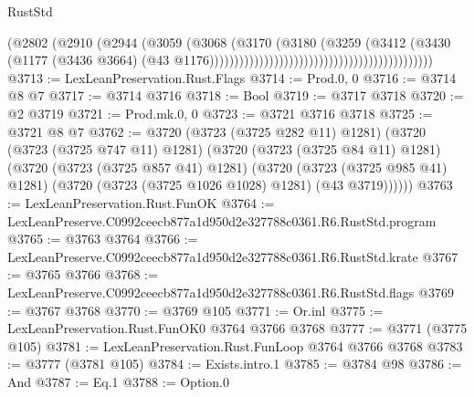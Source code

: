 \begin{lexlean}{RustStd}
\begin{coremodule}
                                                                      (@2802
                                                                        (@2910
                                                                          (@2944
                                                                            (@3059
                                                                              (@3068
                                                                                (@3170
                                                                                  (@3180
                                                                                    (@3259
                                                                                      (@3412
                                                                                        (@3430
                                                                                          (@1177
                                                                                            (@3436
                                                                                              @3664)
                                                                                            (@43
                                                                                              @1176)))))))))))))))))))))))))))))))))))))))))))))
@3713 := LexLeanPreservation.Rust.Flags
@3714 := Prod.{0, 0}
@3716 := @3714 @8 @7
@3717 := @3714 @3716
@3718 := Bool
@3719 := @3717 @3718
@3720 := @2 @3719
@3721 := Prod.mk.{0, 0}
@3723 := @3721 @3716 @3718
@3725 := @3721 @8 @7
@3762 := @3720
    (@3723 (@3725 @282 @11) @1281)
    (@3720
      (@3723 (@3725 @747 @11) @1281)
      (@3720
        (@3723 (@3725 @84 @11) @1281)
        (@3720
          (@3723 (@3725 @857 @41) @1281)
          (@3720
            (@3723 (@3725 @985 @41) @1281)
            (@3720 (@3723 (@3725 @1026 @1028) @1281) (@43 @3719))))))
@3763 := LexLeanPreservation.Rust.FunOK
@3764 := LexLeanPreserve.C0992ceecb877a1d950d2e327788c0361.R6.RustStd.program
@3765 := @3763 @3764
@3766 := LexLeanPreserve.C0992ceecb877a1d950d2e327788c0361.R6.RustStd.krate
@3767 := @3765 @3766
@3768 := LexLeanPreserve.C0992ceecb877a1d950d2e327788c0361.R6.RustStd.flags
@3769 := @3767 @3768
@3770 := @3769 @105
@3771 := Or.inl
@3775 := LexLeanPreservation.Rust.FunOK0 @3764 @3766 @3768
@3777 := @3771 (@3775 @105)
@3781 := LexLeanPreservation.Rust.FunLoop @3764 @3766 @3768
@3783 := @3777 (@3781 @105)
@3784 := Exists.intro.{1}
@3785 := @3784 @98
@3786 := And
@3787 := Eq.{1}
@3788 := Option.{0}

\end{coremodule}
\end{lexlean}
